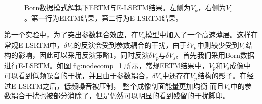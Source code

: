 \begin{figure}[!htb]
   \centering
   \\
   \\
   \caption{Born数据模式解耦下ERTM与E-LSRTM结果。左侧为$V_p$，右侧为$V_s$。第一行为ERTM结果，第二行为E-LSRTM结果。}
   \label{fig:decomp_1}
\end{figure}

第一个实验中，为了突出参数耦合效应，在$V_p$模型中加入了一个高速薄层。这样在常规E-LSRTM中，$\delta
V_s$的反演会受到参数耦合的干扰，由于$\delta V_p$中则较少受到$V_s$结构的影响，因此可以采用反演策略1，同时反演$\delta
V_p$与$\delta V_s$。首先我们采用Born数据进行E-LSRTM。如图\ref{fig:nodecomp_1}所示，常规ERTM结果中，$V_p$和$V_s$成像中
可以看到低频噪音的干扰，并且由于参数耦合，$\delta
V_s$中还存在$V_p$结构的影子。在经过E-LSRTM之后，低频噪音被压制，
整个成像剖面能量更加均衡
而且$V_s$中的参数耦合干扰也被部分消除了，但是仍然可以明显的看到残留的干扰脚印。

